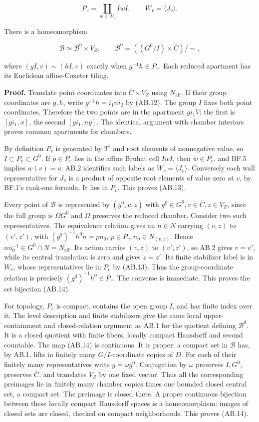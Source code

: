 \documentclass[
  11pt,
]{article}
\begin{document}
\[
 P_v=\coprod_{w\in W_v}I\dot wI,
 \qquad W_v=\langle J_v\rangle.
 \tag{AB.13}
\]

There is a homeomorphism

\[
 \mathcal B\simeq\mathcal B^0\times V_Z,\qquad
 \mathcal B^0=((G^0/I)\times\overline C)/\sim,
 \tag{AB.14}
\]

where \((gI,v)\sim(hI,v)\) exactly when \(g^{-1}h\in P_v\). Each reduced
apartment has its Euclidean affine-Coxeter tiling.

\textbf{Proof.} Translate point coordinates into
\(\overline C\times V_Z\) using \(N_{\mathrm{aff}}\). If their group
coordinates are \(g,h\), write \(g^{-1}h=i_1ni_2\) by (AB.12). The group
\(I\) fixes both point coordinates. Therefore the two points are in the
apartment \(gi_1V\): the first is \([gi_1,x]\), the second
\([gi_1,ny]\). The identical argument with chamber interiors proves
common apartments for chambers.

By definition \(P_v\) is generated by \(T^b\) and root elements of
nonnegative value, so \(I\subset P_v\subset G^0\). If \(p\in P_v\) lies
in the affine Bruhat cell \(I\dot wI\), then \(\dot w\in P_v\), and BF.5
implies \(w(v)=v\). AB.2 identifies such labels as
\(W_v=\langle J_v\rangle\). Conversely each wall representative for
\(J_v\) is a product of opposite root elements of value zero at \(v\),
by BF.1's rank-one formula. It lies in \(P_v\). This proves (AB.13).

Every point of \(\mathcal B\) is represented by \((g^0,v,z)\) with
\(g^0\in G^0,v\in\overline C,z\in V_Z\), since the full group is
\(\Omega G^0\) and \(\Omega\) preserves the reduced chamber. Consider
two such representatives. The equivalence relation gives an \(n\in N\)
carrying \((v,z)\) to \((v',z')\), with \((g^0)^{-1}h^0n=p n_0\),
\(p\in P_v,n_0\in N_{(v,z)}\). Hence
\(n n_0^{-1}\in G^0\cap N=N_{\mathrm{aff}}\). Its action carries
\((v,z)\) to \((v',z')\), so AB.2 gives \(v=v'\), while its central
translation is zero and gives \(z=z'\). Its finite stabilizer label is
in \(W_v\), whose representatives lie in \(P_v\) by (AB.13). Thus the
group-coordinate relation is precisely \((g^0)^{-1}h^0\in P_v\). The
converse is immediate. This proves the set bijection (AB.14).

For topology, \(P_v\) is compact, contains the open group \(I\), and has
finite index over it. The level description and finite stabilizers give
the same local upper-containment and closed-relation argument as AB.1
for the quotient defining \(\mathcal B^0\). It is a closed quotient with
finite fibers, locally compact Hausdorff and second countable. The map
(AB.14) is continuous. It is proper: a compact set in \(\mathcal B\)
has, by AB.1, lifts in finitely many \(G/I\)-coordinate copies of \(D\).
For each of their finitely many representatives write \(g=\omega g^0\).
Conjugation by \(\omega\) preserves \(I,G^0\), preserves
\(\overline C\), and translates \(V_Z\) by one fixed vector. Thus all
the corresponding preimages lie in finitely many chamber copies times
one bounded closed central set, a compact set. The preimage is closed
there. A proper continuous bijection between these locally compact
Hausdorff spaces is a homeomorphism: images of closed sets are closed,
checked on compact neighborhoods. This proves (AB.14).
\end{document}
